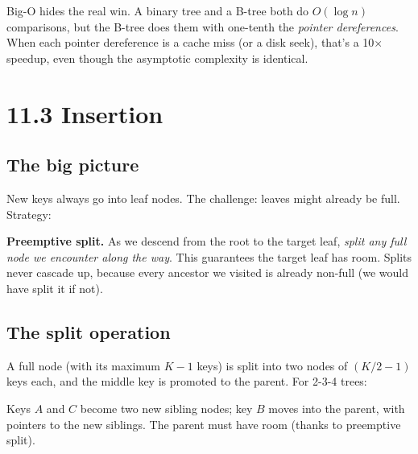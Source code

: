 \documentclass[11pt]{article}
\begin{document}
\begin{ideabox}
Big-O hides the real win. A binary tree and a B-tree both do $O(\log n)$ comparisons, but the B-tree does them with one-tenth the \emph{pointer dereferences}. When each pointer dereference is a cache miss (or a disk seek), that's a 10$\times$ speedup, even though the asymptotic complexity is identical.
\end{ideabox}

\section{11.3 Insertion}

\subsection*{The big picture}

New keys always go into leaf nodes. The challenge: leaves might already be full. Strategy:

\begin{ideabox}
\textbf{Preemptive split.} As we descend from the root to the target leaf, \emph{split any full node we encounter along the way}. This guarantees the target leaf has room. Splits never cascade up, because every ancestor we visited is already non-full (we would have split it if not).
\end{ideabox}

\subsection*{The split operation}

A full node (with its maximum $K-1$ keys) is split into two nodes of $(K/2 - 1)$ keys each, and the middle key is promoted to the parent. For 2-3-4 trees:

\begin{center}
\end{center}

Keys $A$ and $C$ become two new sibling nodes; key $B$ moves into the parent, with pointers to the new siblings. The parent must have room (thanks to preemptive split).
\end{document}
